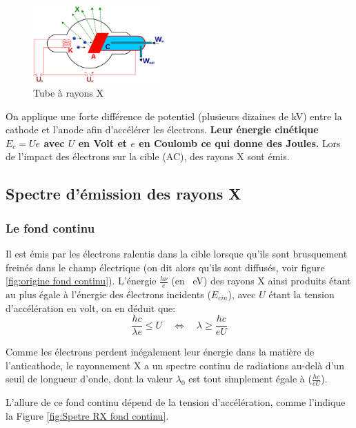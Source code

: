 \documentclass{article}
\begin{document}
\setlength{\intextsep}{0pt}
\begin{figure}
    \centering
    \vspace{-1cm}
    \includegraphics[width=0.45\textwidth]{Fig/tube-a-rayon-x.png} 
    \caption{Tube à rayons X}
    \label{fig:tube à rayons X}
\end{figure}
\vspace{1.5cm}
On applique une forte différence de potentiel (plusieurs dizaines de kV) 
entre la cathode et l'anode afin d'accélérer les électrons.
\textbf{Leur énergie cinétique $E_c = U e$ avec $U$ en Volt et $e$ en Coulomb ce qui donne des Joules.}
Lors de l'impact des électrons sur la  cible (AC), des rayons X sont émis.

\vspace{2cm}
\subsection{Spectre d'émission des rayons X}

\subsubsection{Le fond continu}

Il est émis par les électrons ralentis dans la cible lorsque qu'ils sont 
brusquement freinés dans le champ électrique (on dit alors qu'ils sont diffusés, voir figure \ref{fig:origine fond continu}). 
L'énergie $\frac{h\nu}{e}$ (en \qty{}{eV}) des rayons X ainsi produits étant au plus égale à l'énergie des 
électrons incidents ($E_{cin}$), avec $U$ étant la tension d'accélération en volt, on en déduit que:
$$\frac{hc}{\lambda e} \le U \quad \Longleftrightarrow \quad \lambda \ge \frac{hc}{eU}$$

Comme les électrons perdent inégalement leur énergie dans la matière de l'anticathode, 
le rayonnement X a un spectre continu de radiations au-delà d'un seuil de longueur d'onde, 
dont la valeur $\lambda_0$ est tout simplement égale à ($\frac{hc}{eU}$). 


L'allure de ce fond continu dépend de la tension d'accélération, comme l'indique la Figure \ref{fig:Spetre RX fond continu}.
\end{document}
